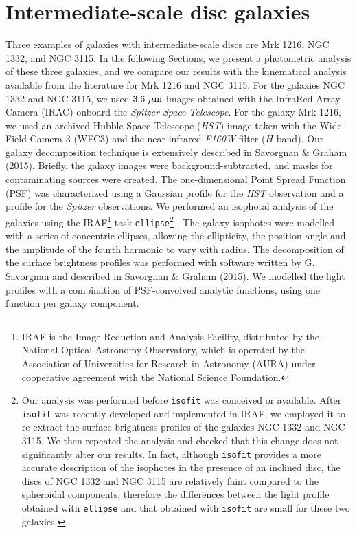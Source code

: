 \documentclass[useAMS,usenatbib,article]{mnras}
\begin{document}
\section{Intermediate-scale disc galaxies}
\label{sec:gal}
Three examples of galaxies with intermediate-scale discs are Mrk 1216, NGC 1332, and NGC 3115. 
In the following Sections, we present a photometric analysis of these three galaxies, 
and we compare our results with the kinematical analysis available from the literature for Mrk 1216 and NGC 3115. 
For the galaxies NGC 1332 and NGC 3115, we used $3.6~\rm \mu m$ images obtained with the InfraRed Array Camera (IRAC) 
onboard the \emph{Spitzer Space Telescope}. 
For the galaxy Mrk 1216, we used an archived Hubble Space Telescope (\emph{HST}) image  
taken with the Wide Field Camera 3 (WFC3) and the near-infrared \emph{F160W} filter ($H$-band). 
Our galaxy decomposition technique is extensively described in Savorgnan \& Graham (2015).
Briefly, the galaxy images were background-subtracted, and masks for contaminating sources were created. 
The one-dimensional Point Spread Function (PSF) was characterized using a Gaussian profile for the \emph{HST} observation 
and a \cite{moffat1969} profile for the \emph{Spitzer} observations.
We performed an isophotal analysis of the galaxies using the IRAF\footnote{IRAF 
is the Image Reduction and Analysis Facility, distributed by the National Optical Astronomy Observatory, 
which is operated by the Association of Universities for Research in Astronomy (AURA) 
under cooperative agreement with the National Science Foundation.} task {\tt ellipse}\footnote{Our analysis 
was performed before {\tt isofit} \citep{ciambur2015} was conceived or available. 
After {\tt isofit} was recently developed and implemented in IRAF, 
we employed it to re-extract the surface brightness profiles of the galaxies NGC 1332 and NGC 3115. 
We then repeated the analysis and checked that this change does not significantly alter our results. 
In fact, although {\tt isofit} provides a more accurate description of the isophotes in the presence of an inclined disc, 
the discs of NGC 1332 and NGC 3115 are relatively faint compared to the spheroidal components, 
therefore the differences between the light profile obtained with {\tt ellipse} and that obtained with {\tt isofit} 
are small for these two galaxies. } 
\citep{taskellipse}. 
The galaxy isophotes were modelled with a series of concentric ellipses, 
allowing the ellipticity, the position angle and the amplitude of the fourth harmonic to vary with radius.  
The decomposition of the surface brightness profiles was performed with software written by G. Savorgnan 
and described in Savorgnan \& Graham (2015).
We modelled the light profiles with a combination of PSF-convolved analytic functions, 
using one function per galaxy component. 
\end{document}
